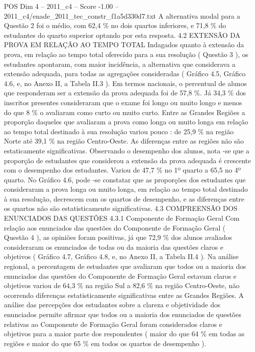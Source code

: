 \begin{textsample}{POS Dim 4 – 2011\_c4 – Score -1.00 – 2011\_c4/enade\_2011\_tec\_constr\_f1a5d330d7.txt}
A alternativa modal para a Questão 2 foi o médio, com 62,4 \% no dois quartos inferiores, e 71,8 \% do estudantes do quarto superior optando por esta resposta. 4.2 EXTENSÃO DA PROVA EM RELAÇÃO AO TEMPO TOTAL Indagados quanto à extensão da prova, em relação ao tempo total oferecido para a sua resolução ( Questão 3 ), os estudantes apontaram, com maior incidência, a alternativa que considerava a extensão adequada, para todas as agregações consideradas ( Gráfico 4.5, Gráfico 4.6, e, no Anexo II, a Tabela II.3 ).
Em termos nacionais, o percentual de alunos que responderam ser a extensão da prova adequada foi de 57,8 \%.
Já 34,3 \% dos inscritos presentes consideraram que o exame foi longo ou muito longo e menos do que 8 \% o avaliaram como curto ou muito curto.
Entre as Grandes Regiões a proporção daqueles que avaliaram a prova como longa ou muito longa em relação ao tempo total destinado à sua resolução variou pouco : de 25,9 \% na região Norte até 39,1 \% na região Centro-Oeste.
As diferenças entre as regiões não são estaticamente significativas.
Observando o desempenho dos alunos, nota -se que a proporção de estudantes que considerou a extensão da prova adequada é crescente com o desempenho dos estudantes.
Variou de 47,7 \% no 1º quarto a 65,5 no 4º quarto.
No Gráfico 4.6, pode -se constatar que as proporções dos estudantes que consideraram a prova longa ou muito longa, em relação ao tempo total destinado à sua resolução, decrescem com os quartos de desempenho, e as diferenças entre os quartos não são estatisticamente significativas. 4.3 COMPREENSÃO DOS ENUNCIADOS DAS QUESTÕES 4.3.1 Componente de Formação Geral Com relação aos enunciados das questões do Componente de Formação Geral ( Questão 4 ), as opiniões foram positivas, já que 72,9 \% dos alunos avaliados consideraram os enunciados de todas ou da maioria das questões claros e objetivos ( Gráfico 4.7, Gráfico 4.8, e, no Anexo II, a Tabela II.4 ).
Na análise regional, a percentagem de estudantes que avaliaram que todos ou a maioria dos enunciados das questões do Componente de Formação Geral estavam claros e objetivos variou de 64,3 \% na região Sul a 82,6 \% na região Centro-Oeste, não ocorrendo diferenças estatisticamente significativas entre as Grandes Regiões.
A análise das percepções dos estudantes sobre a clareza e objetividade dos enunciados permite afirmar que todos ou a maioria dos enunciados de questões relativas ao Componente de Formação Geral foram considerados claros e objetivos para a maior parte dos respondentes ( maior do que 64 \% em todas as regiões e maior do que 65 \% em todos os quartos de desempenho ).

\end{textsample}

